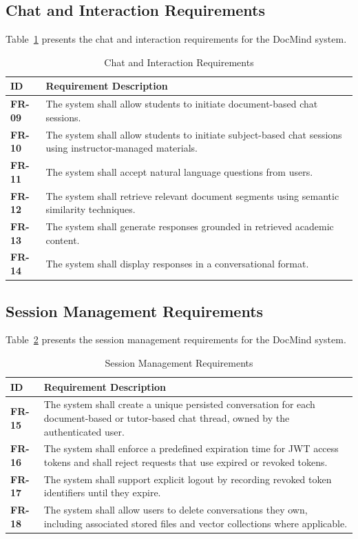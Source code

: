 \documentclass[12pt, a4paper, oneside]{report}
\let\oldsubsection\subsection
\renewcommand{\subsection}{%
  \addtocontents{toc}{\protect\needspace{3\baselineskip}}%
  \oldsubsection
}
\begin{document}
\subsection{Chat and Interaction Requirements}

Table~\ref{tab:fr_chat} presents the chat and interaction requirements for the DocMind system.

\begin{table}[H]
\centering
\caption{Chat and Interaction Requirements}
\label{tab:fr_chat}
\begin{tabular}{>{\bfseries}lp{10cm}}
\toprule
ID & Requirement Description \\
\midrule
FR-09 & The system shall allow students to initiate document-based chat sessions. \\
FR-10 & The system shall allow students to initiate subject-based chat sessions using instructor-managed materials. \\
FR-11 & The system shall accept natural language questions from users. \\
FR-12 & The system shall retrieve relevant document segments using semantic similarity techniques. \\
FR-13 & The system shall generate responses grounded in retrieved academic content. \\
FR-14 & The system shall display responses in a conversational format. \\
\bottomrule
\end{tabular}
\end{table}
\newpage
\subsection{Session Management Requirements}

Table~\ref{tab:fr_session} presents the session management requirements for the DocMind system.

\begin{table}[H]
\centering
\caption{Session Management Requirements}
\label{tab:fr_session}
\begin{tabular}{>{\bfseries}lp{10cm}}
\toprule
ID & Requirement Description \\
\midrule
FR-15 & The system shall create a unique persisted conversation for each document-based or tutor-based chat thread, owned by the authenticated user. \\
FR-16 & The system shall enforce a predefined expiration time for JWT access tokens and shall reject requests that use expired or revoked tokens. \\
FR-17 & The system shall support explicit logout by recording revoked token identifiers until they expire. \\
FR-18 & The system shall allow users to delete conversations they own, including associated stored files and vector collections where applicable. \\
\bottomrule
\end{tabular}
\end{table}
\newpage
\end{document}
